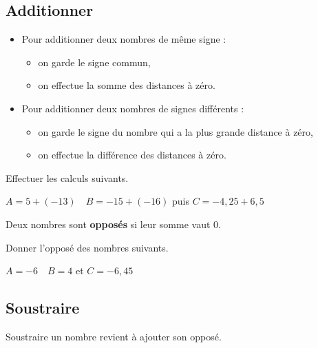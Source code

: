 \documentclass[a4paper]{book}
\begin{document}
    
\subsection{Additionner}
    
    \begin{definition}[Addition]
        \begin{itemize}
            \item Pour additionner deux nombres de même signe :
            \begin{itemize}
                \item on garde le signe commun,
                \item on effectue la somme des distances à zéro.
            \end{itemize}
            \item Pour additionner deux nombres de signes différents :
            \begin{itemize}
                \item on garde le signe du nombre qui a la plus grande distance à zéro,
                \item on effectue la différence des distances à zéro.
            \end{itemize}
        \end{itemize}
    \end{definition}
    
    \begin{exemple}
        Effectuer les calculs suivants.
        
        $A = 5+ (-13) \quad  B = -15 + (-16)$ puis $C = - 4,25 + 6,5$
    \end{exemple}

    \begin{definition}[Opposés]
        Deux nombres sont \textbf{opposés} si leur somme vaut 0.
    \end{definition}
        
    \begin{exemple}
        Donner l'opposé des nombres suivants.

        $A=-6 \quad B=4$ et $C=-6,45$
    \end{exemple}
    
\subsection{Soustraire}
    
    \begin{propriete} 
        Soustraire un nombre revient à ajouter son opposé.
    \end{propriete}
    
\end{document}
